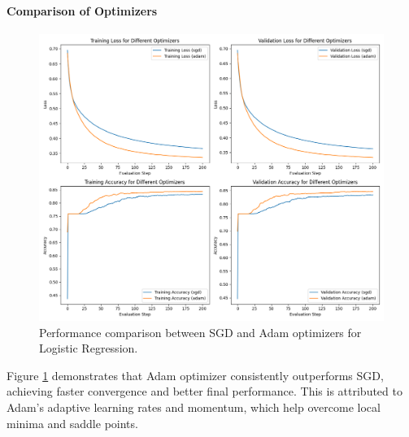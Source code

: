 \documentclass[journal, a4paper]{IEEEtran}
\begin{document}
\paragraph{Comparison of Optimizers}
\begin{figure}[H]
\centering
\includegraphics[width=\linewidth]{logistic_regression_optimizers.png}
\caption{Performance comparison between SGD and Adam optimizers for Logistic Regression.}
\label{fig:lr_opt}
\end{figure}

Figure \ref{fig:lr_opt} demonstrates that Adam optimizer consistently outperforms SGD, achieving faster convergence and better final performance. This is attributed to Adam's adaptive learning rates and momentum, which help overcome local minima and saddle points.
\end{document}
